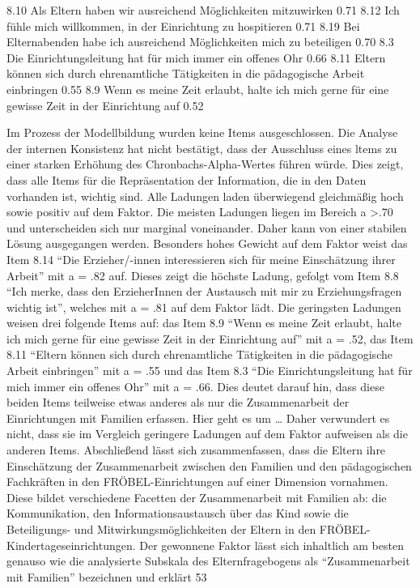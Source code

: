 \documentclass[12pt,a4paper]{article}
\begin{document}
8.10 Als Eltern haben wir ausreichend Möglichkeiten mitzuwirken              0.71
8.12 Ich fühle mich willkommen, in der Einrichtung zu hospitieren              0.71
8.19 Bei Elternabenden habe ich ausreichend Möglichkeiten
        mich zu beteiligen                                                                                   0.70
8.3 Die Einrichtungsleitung hat für mich immer ein offenes Ohr                   0.66         
8.11 Eltern können sich durch ehrenamtliche Tätigkeiten in die
        pädagogische Arbeit einbringen                                                              0.55
8.9 Wenn es meine Zeit erlaubt, halte ich mich gerne für eine
      gewisse Zeit in der Einrichtung auf                                                          0.52

Im Prozess der Modellbildung wurden keine Items ausgeschlossen. Die Analyse der internen Konsistenz hat nicht bestätigt, dass der Ausschluss eines ltems zu einer starken Erhöhung des Chronbachs-Alpha-Wertes führen würde. Dies zeigt, dass alle Items für die Repräsentation der Information, die in den Daten vorhanden ist, wichtig sind.
	Alle Ladungen laden überwiegend gleichmäßig hoch sowie positiv auf dem Faktor. Die meisten Ladungen liegen im Bereich a >.70 und unterscheiden sich nur marginal voneinander. Daher kann von einer stabilen Lösung ausgegangen werden. 
	Besonders hohes Gewicht auf dem Faktor weist das Item 8.14 "`Die Erzieher/-innen interessieren sich für meine Einschätzung ihrer Arbeit"' mit a = .82 auf. Dieses zeigt die höchste Ladung, gefolgt vom Item 8.8 "`Ich merke, dass den ErzieherInnen der Austausch mit mir zu Erziehungsfragen wichtig ist"', welches mit a = .81 auf dem Faktor lädt. 
	Die geringsten Ladungen weisen drei folgende Items auf: das Item 8.9 "`Wenn es meine Zeit erlaubt, halte ich mich gerne für eine gewisse Zeit in der Einrichtung auf"' mit a = .52, das Item 8.11 "`Eltern können sich durch ehrenamtliche Tätigkeiten in die pädagogische Arbeit einbringen"' mit a = .55 und das Item 8.3 "`Die Einrichtungsleitung hat für mich immer ein offenes Ohr"' mit a = .66. Dies deutet darauf hin, dass diese beiden Items teilweise etwas anderes als nur die Zusammenarbeit der Einrichtungen mit Familien erfassen. Hier geht es um … Daher verwundert es nicht, dass sie im Vergleich geringere Ladungen auf dem Faktor aufweisen als die anderen Items.
	Abschließend lässt sich zusammenfassen, dass die Eltern ihre Einschätzung der Zusammenarbeit zwischen den Familien und den pädagogischen Fachkräften in den FRÖBEL-Einrichtungen auf einer Dimension vornahmen. Diese bildet verschiedene Facetten der Zusammenarbeit mit Familien ab: die Kommunikation, den Informationsaustausch über das Kind sowie die Beteiligungs- und Mitwirkungsmöglichkeiten der Eltern in den FRÖBEL-Kindertageseinrichtungen. Der gewonnene Faktor lässt sich inhaltlich am besten genauso wie die analysierte Subskala des Elternfragebogens als "`Zusammenarbeit mit Familien"' bezeichnen und erklärt 53%
\end{document}
